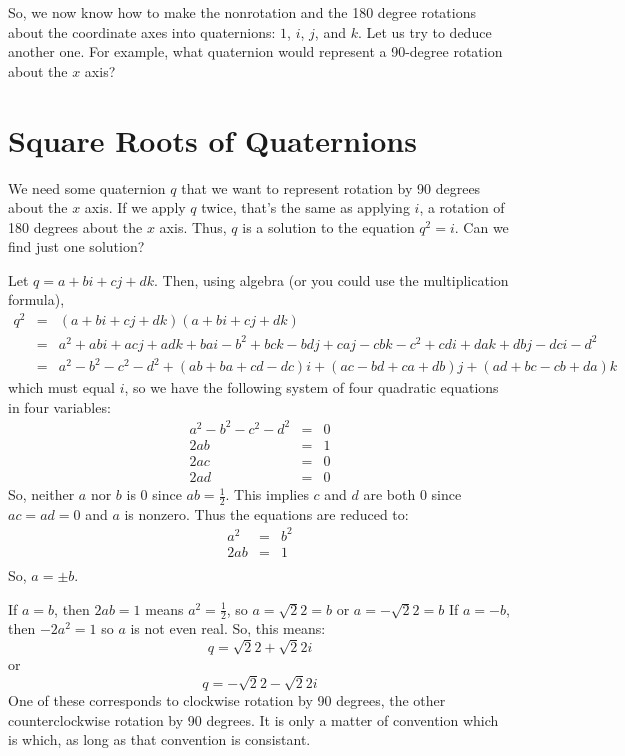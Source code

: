 \documentclass[letter,12pt]{article}
\begin{document}
So, we now know how to make the nonrotation and the 180 degree rotations about the coordinate axes into quaternions: $1$, $i$, $j$, and $k$.  Let us try to deduce another one.  For example, what quaternion would represent a 90-degree rotation about the $x$ axis?

\section{Square Roots of Quaternions}

We need some quaternion $q$ that we want to represent rotation by 90 degrees about the $x$ axis.  If we apply $q$ twice, that’s the same as applying $i$, a rotation of 180 degrees about the $x$ axis.  Thus, $q$ is a solution to the equation $q^2 = i$.  Can we find just one solution?

Let $q=a+bi+cj+dk$.  Then, using algebra (or you could use the multiplication formula), 
\begin{eqnarray*}
q^2 &=& (a+bi+cj+dk)(a+bi+cj+dk)\\
&=&a^2 +abi + acj + adk + bai - b^2 +bck - bdj + caj - cbk - c^2 +cdi + dak + dbj - dci - d^2\\
&=&a^2-b^2-c^2-d^2 + (ab+ba+cd-dc)i + (ac-bd+ca+db)j + (ad+bc-cb +da)k
\end{eqnarray*}
which must equal $i$, so we have the following system of four quadratic equations in four variables:
\begin{eqnarray*}
a^2-b^2-c^2-d^2 &=&0\\
2ab&=&1\\
2ac&=&0\\
2ad&=&0
\end{eqnarray*}
So, neither $a$ nor $b$ is 0 since $ab=\frac12$.  This implies $c$ and $d$ are both 0 since $ac=ad=0$ and $a$ is nonzero.
Thus the equations are reduced to:
\begin{eqnarray*}
a^2&=&b^2\\
2ab&=&1\\
\end{eqnarray*}
So, $a=\pm{b}$.

If $a=b$, then $2ab=1$ means $a^2=\frac12$, so $a=\sqrt{2}{2}=b$ or $a=-\sqrt{2}{2}=b$
If $a=-b$, then $-2a^2=1$ so $a$ is not even real.  So, this means:
\[
q=\sqrt{2}2 + \sqrt{2}2i
\]
or
\[
q=-\sqrt{2}2 - \sqrt{2}2i
\]
One  of these corresponds to clockwise rotation by 90 degrees, the other counterclockwise rotation by 90 degrees.  It is only a matter of convention which is which, as long as that convention is consistant.
\end{document}
